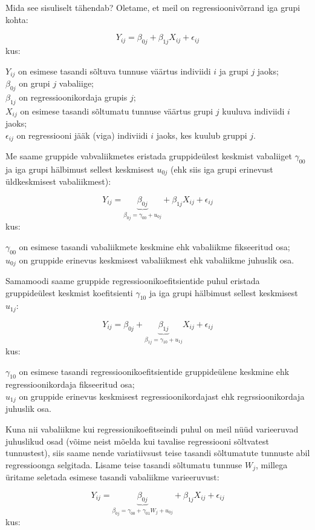 \documentclass[
]{book}
\begin{document}
Mida see sisuliselt tähendab? Oletame, et meil on regressioonivõrrand iga grupi kohta:

\[Y_{ij} = \beta_{0j} + \beta_{1j}X_{ij}+\epsilon_{ij}\]
kus:

\(Y_{ij}\) on esimese tasandi sõltuva tunnuse väärtus indiviidi \(i\) ja grupi \(j\) jaoks;\\
\(\beta_{0j}\) on grupi \(j\) vabaliige;\\
\(\beta_{1j}\) on regressioonikordaja grupis \(j\);\\
\(X_{ij}\) on esimese tasandi sõltumatu tunnuse väärtus grupi \(j\) kuuluva indiviidi \(i\) jaoks;\\
\(\epsilon_{ij}\) on regressiooni jääk (viga) indiviidi \(i\) jaoks, kes kuulub gruppi \(j\).

Me saame gruppide vabvaliikmetes eristada gruppideülest keskmist vabaliiget \(\gamma_{00}\) ja iga grupi hälbimust sellest keskmisest \(u_{0j}\) (ehk siis iga grupi erinevust üldkeskmisest vabaliikmest):

\[Y_{ij} = \underbrace{\beta_{0j}}_{\beta_{0j}= \gamma_{00}+ u_{0j}} + \beta_{1j}X_{ij}+\epsilon_{ij}\]
kus:

\(\gamma_{00}\) on esimese tasandi vabaliikmete keskmine ehk vabaliikme fikseeritud osa;\\
\(u_{0j}\) on gruppide erinevus keskmisest vabaliikmest ehk vabaliikme juhuslik osa.

Samamoodi saame gruppide regressioonikoefitsientide puhul eristada gruppideülest keskmist koefitsienti \(\gamma_{10}\) ja iga grupi hälbimust sellest keskmisest \(u_{1j}\):

\[Y_{ij} = \beta_{0j} + \underbrace{\beta_{1j}}_{\beta_{1j}= \gamma_{10}+ u_{1j}}X_{ij}+\epsilon_{ij}\]
kus:

\(\gamma_{10}\) on esimese tasandi regressioonikoefitsientide gruppideülene keskmine ehk regressioonikordaja fikseeritud osa;\\
\(u_{1j}\) on gruppide erinevus keskmisest regressioonikordajast ehk regrssioonikordaja juhuslik osa.

Kuna nii vabaliikme kui regressionikoefitseindi puhul on meil nüüd varieeruvad juhuslikud osad (võime neist mõelda kui tavalise regressiooni sõltvatest tunnustest), siis saame nende variatiivsust teise tasandi sõltumatute tunnuste abil regressioonga selgitada. Lisame teise tasandi sõltumatu tunnuse \(W_j\), millega üritame seletada esimese tasandi vabaliikme varieeruvust:

\[Y_{ij} = \underbrace{\beta_{0j}}_{\beta_{0j}= \gamma_{00}+ \gamma_{01}W_j + u_{0j}} + \beta_{1j}X_{ij}+\epsilon_{ij}\]
kus:
\end{document}
